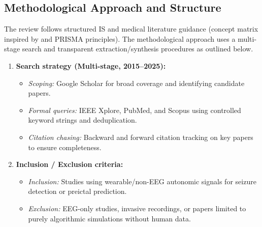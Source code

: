 \subsection{Methodological Approach and Structure}
The review follows structured IS and medical literature guidance
(concept matrix inspired by \cite{websterAnalyzingPastDetermine2002}
and PRISMA principles). The methodological approach uses a multi-stage
search and transparent extraction/synthesis procedures as outlined
below.

\begin{enumerate}
  \item \textbf{Search strategy (Multi-stage, 2015--2025):}
    \begin{itemize}
      \item \textit{Scoping:} Google Scholar for broad coverage and
        identifying candidate papers.
      \item \textit{Formal queries:} IEEE Xplore, PubMed, and Scopus
        using controlled keyword strings and deduplication.
      \item \textit{Citation chasing:} Backward and forward citation
        tracking on key papers to ensure completeness.
    \end{itemize}
  \item \textbf{Inclusion / Exclusion criteria:}
    \begin{itemize}
      \item \textit{Inclusion:} Studies using wearable/non-EEG autonomic
        signals for seizure detection or preictal prediction.
      \item \textit{Exclusion:} EEG-only studies, invasive recordings,
        or papers limited to purely algorithmic simulations without
        human data.
    \end{itemize}
\end{enumerate}

